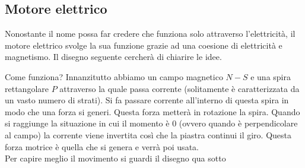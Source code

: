 \subsection{Motore elettrico}
Nonostante il nome possa far credere che funziona solo attraverso l'elettricità, il motore elettrico 
svolge la sua funzione grazie ad una coesione di elettricità e magnetismo. Il disegno seguente 
cercherà di chiarire le idee.
\begin{center}
\end{center}
Come funziona? Innanzitutto abbiamo un campo magnetico $N-S$ e una spira rettangolare $P$ attraverso 
la quale passa corrente (solitamente è caratterizzata da un vasto numero di strati). Si fa passare 
corrente all'interno di questa spira in modo che una forza si generi. Questa forza metterà in 
rotazione la spira. Quando si raggiunge la situazione in cui il momento è $0$ (ovvero quando è 
perpendicolare al campo) la corrente viene invertita così che la piastra continui il giro. Questa 
forza motrice è quella che si genera e verrà poi usata.\\
Per capire meglio il movimento si guardi il disegno qua sotto
